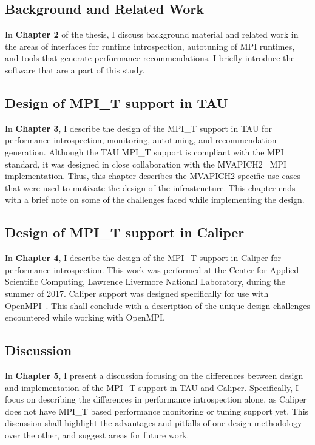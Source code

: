 \subsection {Background and Related Work}
In \textbf{Chapter 2} of the thesis, I discuss background material and related work in the areas of interfaces for runtime introspection, autotuning of MPI runtimes, and tools that generate performance recommendations. I briefly introduce the  software that are a part of this study.

\subsection {Design of MPI\_T support in TAU}
In \textbf{Chapter 3}, I describe the design of the MPI\_T support in TAU for performance introspection, monitoring, autotuning, and recommendation generation. Although the TAU MPI\_T support is compliant with the MPI standard, it was designed in close collaboration with the MVAPICH2~\cite{MVAPICH2} MPI implementation. Thus, this chapter describes the MVAPICH2-specific use cases that were used to motivate the design of the infrastructure. This chapter ends with a brief note on some of the challenges faced while implementing the design.

\subsection {Design of MPI\_T support in Caliper}
In \textbf{Chapter 4}, I describe the design of the MPI\_T support in Caliper for performance introspection. This work was performed at the Center for Applied Scientific Computing, Lawrence Livermore National Laboratory, during the summer of 2017. Caliper support was designed specifically for use with OpenMPI~\cite{OpenMPI}. This shall conclude with a description of the unique design challenges encountered while working with OpenMPI.

\subsection {Discussion}
In \textbf{Chapter 5}, I present a discussion focusing on the differences between design and implementation of the MPI\_T support in TAU and Caliper. Specifically, I focus on describing the differences in performance introspection alone, as Caliper does not have MPI\_T based performance monitoring or tuning support yet. This discussion shall highlight the advantages and pitfalls of one design methodology over the other, and suggest areas for future work. 

